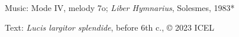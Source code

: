 



\begin{hymnsource}
Music: Mode IV, melody 7o; \emph{Liber Hymnarius}, Solesmes, 1983*

Text: \emph{Lucis largitor splendide}, before 6th c., © 2023 ICEL
\end{hymnsource}
